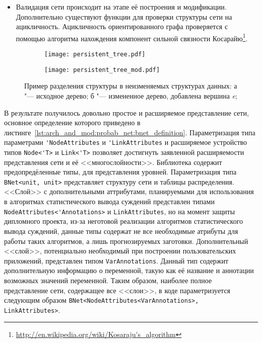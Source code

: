 \begin{itemize}
  \item Валидация сети происходит на этапе её построения и модификации.
  Дополнительно существуют функции для проверки структуры сети на ацикличность.
  Ацикличность ориентированного графа проверяется с помощью алгоритма нахождения компонент сильной связности Косарайю\footnote{\url{http://en.wikipedia.org/wiki/Kosaraju's_algorithm}}.

\end{itemize}

\begin{figure}[ht]
\centering
  \begin{subfigure}[b]{0.41\linewidth}
    \centering
    \texttt{[image: persistent\_tree.pdf]}
    \caption{}
  \end{subfigure}
  \begin{subfigure}[b]{0.58\linewidth}
    \centering
    \texttt{[image: persistent\_tree\_mod.pdf]}
    \caption{}
  \end{subfigure}
  \caption{ Пример разделения структуры в неизменяемых структурах данных:
            а "--- исходное дерево;
            б "--- измененное дерево, добавлена вершина \textit{e};}
  \label{fig:arch_and_mod:probab_net:immutable_ds_modification}
\end{figure}

В результате получилось довольно простое и расширяемое представление сети, основное определение которого приведено в листинге~\ref{lst:arch_and_mod:probab_net:bnet_definition}.
Параметризация типа параметрами \lstinline!'NodeAttributes! и \lstinline!'LinkAttributes! и расширяемое устройство типов \lstinline!Node<'T>! и \lstinline!Link<'T>! позволяет достигнуть заявленной расширяемости представления сети и её <<многослойности>>.
Библиотека содержит предопредёленные типы, для представления уровней.
Параметризация типа \lstinline!BNet<unit, unit>! представляет структуру сети и таблицы распределения.
<<Слой>> с дополнительными аттрибутами, планируемыми для использования в алгоритмах статистического вывода суждений представлен типами \lstinline!NodeAttributes<'Annotations>! и \lstinline!LinkAttributes!, но на момент защиты дипломного проекта, из-за неготовой реализации алгоритмов статистического вывода суждений, данные типы содержат не все необходимые атрибуты для работы таких алгоритмов, а лишь прогнозируемых заготовки.
Дополнительный <<слой>>, потенциально необходимый при построении пользовательских приложений, представлен типом \lstinline!VarAnnotations!.
Данный тип содержит дополнительную информацию о переменной, такую как её название и аннотации возможных значений переменной.
Таким образом, наиболее полное представление сети, содержащее все <<слои>>, в коде параметризуется следующим образом \lstinline!BNet<NodeAttributes<VarAnnotations>, LinkAttributes>!.

